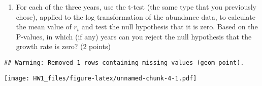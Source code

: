 \documentclass[
]{article}
\newenvironment{Shaded}{\begin{snugshade}}{\end{snugshade}}
\newcommand{\DataTypeTok}[1]{\textcolor[rgb]{0.13,0.29,0.53}{#1}}
\newcommand{\DecValTok}[1]{\textcolor[rgb]{0.00,0.00,0.81}{#1}}
\newcommand{\KeywordTok}[1]{\textcolor[rgb]{0.13,0.29,0.53}{\textbf{#1}}}
\newcommand{\NormalTok}[1]{#1}
\newcommand{\OperatorTok}[1]{\textcolor[rgb]{0.81,0.36,0.00}{\textbf{#1}}}
\newcommand{\StringTok}[1]{\textcolor[rgb]{0.31,0.60,0.02}{#1}}
\providecommand{\tightlist}{%
  \setlength{\itemsep}{0pt}\setlength{\parskip}{0pt}}
\begin{document}
\begin{enumerate}
\def\labelenumi{\arabic{enumi}.}
\setcounter{enumi}{6}
\tightlist
\item
  For each of the three years, use the t-test (the same type that you
  previously chose), applied to the log transformation of the abundance
  data, to calculate the mean value of \(r_t\) and test the null
  hypothesis that it is zero. Based on the P-values, in which (if any)
  years can you reject the null hypothesis that the growth rate is zero?
  (2 points)
\end{enumerate}

\begin{Shaded}
\end{Shaded}

\begin{verbatim}
## Warning: Removed 1 rows containing missing values (geom_point).
\end{verbatim}

\texttt{[image: HW1\_files/figure-latex/unnamed-chunk-4-1.pdf]}
\end{document}
